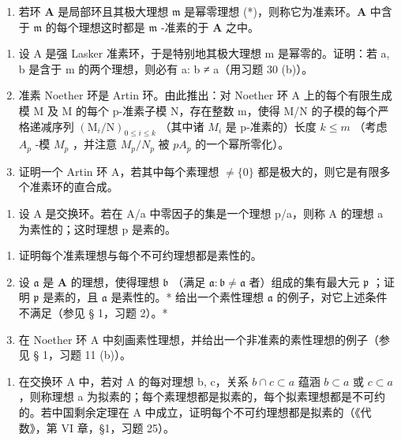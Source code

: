 \begin{enumerate}
\def\labelenumi{\arabic{enumi}.}
\setcounter{enumi}{31}
\tightlist
\item
  若环 \(\mathbf{A}\) 是局部环且其极大理想 \(\mathfrak{m}\) 是幂零理想 (*)，则称它为准素环。\(\mathbf{A}\) 中含于 \(\mathfrak{m}\) 的每个理想这时都是 \(\mathfrak{m}\) -准素的于 \(\mathbf{A}\) 之中。
\end{enumerate}

\begin{enumerate}
\def\labelenumi{(\alph{enumi})}
\item
  设 A 是强 Lasker 准素环，于是特别地其极大理想 m 是幂零的。证明：若 a, b 是含于 m 的两个理想，则必有 a: b ≠ a（用习题 30 (b)）。
\item
  准素 Noether 环是 Artin 环。由此推出：对 Noether 环 A 上的每个有限生成模 M 及 M 的每个 p-准素子模 N，存在整数 m，使得 M/N 的子模的每个严格递减序列 \((\mathrm{M}_{i}/\mathrm{N})_{0\leqslant i\leqslant k}\) （其中诸 \(M_{i}\) 是 p-准素的）长度 \(k\leqslant m\) （考虑 \(A_{p}\) -模 \(M_{p}\) ，并注意 \(M_{p}/N_{p}\) 被 \(pA_{p}\) 的一个幂所零化）。
\item
  证明一个 Artin 环 A，若其中每个素理想 \(\neq\{0\}\) 都是极大的，则它是有限多个准素环的直合成。
\end{enumerate}

\begin{enumerate}
\def\labelenumi{\arabic{enumi}.}
\setcounter{enumi}{32}
\tightlist
\item
  设 A 是交换环。若在 A/a 中零因子的集是一个理想 p/a，则称 A 的理想 a 为素性的；这时理想 p 是素的。
\end{enumerate}

\begin{enumerate}
\def\labelenumi{(\alph{enumi})}
\item
  证明每个准素理想与每个不可约理想都是素性的。
\item
  设 \(\mathfrak{a}\) 是 \(\mathbf{A}\) 的理想，使得理想 \(\mathfrak{b}\) （满足 \(\mathfrak{a}: \mathfrak{b} \neq \mathfrak{a}\) 者）组成的集有最大元 \(\mathfrak{p}\) ；证明 \(\mathfrak{p}\) 是素的，且 \(\mathfrak{a}\) 是素性的。* 给出一个素性理想 \(\mathfrak{a}\) 的例子，对它上述条件不满足（参见 § 1，习题 2）。*
\item
  在 Noether 环 A 中刻画素性理想，并给出一个非准素的素性理想的例子（参见 § 1，习题 11 (b)）。
\end{enumerate}

\begin{enumerate}
\def\labelenumi{\arabic{enumi}.}
\setcounter{enumi}{33}
\tightlist
\item
  在交换环 A 中，若对 A 的每对理想 b, c，关系 \(b \cap c \subset a\) 蕴涵 \(b \subset a\) 或 \(c \subset a\) ，则称理想 a 为拟素的；每个素理想都是拟素的，每个拟素理想都是不可约的。若中国剩余定理在 A 中成立，证明每个不可约理想都是拟素的（《代数》，第 VI 章，§1，习题 25）。
\end{enumerate}

